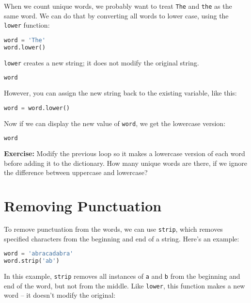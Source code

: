 When we count unique words, we probably want to treat
\passthrough{\lstinline!The!} and \passthrough{\lstinline!the!} as the
same word. We can do that by converting all words to lower case, using
the \passthrough{\lstinline!lower!} function:

\begin{lstlisting}[language=Python,style=source]
word = 'The'
word.lower()
\end{lstlisting}

\passthrough{\lstinline!lower!} creates a new string; it does not modify
the original string.

\begin{lstlisting}[language=Python,style=source]
word
\end{lstlisting}

However, you can assign the new string back to the existing variable,
like this:

\begin{lstlisting}[language=Python,style=source]
word = word.lower()
\end{lstlisting}

Now if we can display the new value of \passthrough{\lstinline!word!},
we get the lowercase version:

\begin{lstlisting}[language=Python,style=source]
word
\end{lstlisting}

\textbf{Exercise:} Modify the previous loop so it makes a lowercase
version of each word before adding it to the dictionary. How many unique
words are there, if we ignore the difference between uppercase and
lowercase?

\hypertarget{removing-punctuation}{%
\section{Removing Punctuation}\label{removing-punctuation}}

To remove punctuation from the words, we can use
\passthrough{\lstinline!strip!}, which removes specified characters from
the beginning and end of a string. Here's an example:

\begin{lstlisting}[language=Python,style=source]
word = 'abracadabra'
word.strip('ab')
\end{lstlisting}

In this example, \passthrough{\lstinline!strip!} removes all instances
of \passthrough{\lstinline!a!} and \passthrough{\lstinline!b!} from the
beginning and end of the word, but not from the middle. Like
\passthrough{\lstinline!lower!}, this function makes a new word -- it
doesn't modify the original:

